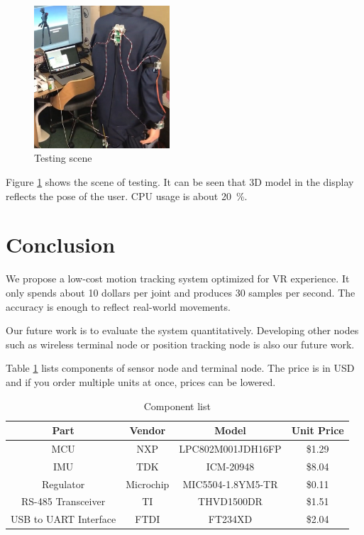 \documentclass[journal]{IEEEtran}
\begin{document}
\begin{figure}[tb]
    \centering
    \includegraphics[width=0.45\textwidth]{testing.jpg}
    \caption{Testing scene} \label{testing}
\end{figure}
Figure \ref{testing} shows the scene of testing.
It can be seen that 3D model in the display reflects the pose of the user.
CPU usage is about \SI{20}{\percent}.

\section{Conclusion}
We propose a low-cost motion tracking system optimized for VR experience.
It only spends about 10 dollars per joint and produces 30 samples per second.
The accuracy is enough to reflect real-world movements.

Our future work is to evaluate the system quantitatively.
Developing other nodes such as wireless terminal node or position tracking node is also our future work.

\appendix
Table \ref{list} lists components of sensor node and terminal node.
The price is in USD and if you order multiple units at once, prices can be lowered.

\begin{table}[t]
    \centering
    \caption{Component list} \label{list}
    \begin{tabular}{cccc}
        \hline
        Part & Vendor & Model & Unit Price \\ \hline
        MCU & NXP & LPC802M001JDH16FP & \$1.29 \\
        IMU & TDK & ICM-20948 & \$8.04 \\
        Regulator & Microchip & MIC5504-1.8YM5-TR & \$0.11 \\
        RS-485 Transceiver & TI & THVD1500DR & \$1.51 \\
        USB to UART Interface & FTDI & FT234XD & \$2.04 \\
        \hline
    \end{tabular}
\end{table}
\end{document}
